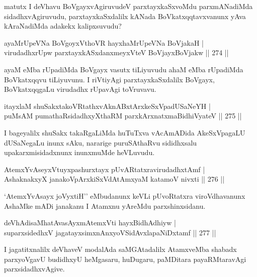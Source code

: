 \begin{artha}
matutx I deVhavu BoVgayxvAgiruvudeV parxtayxkaSxvoMdu parxmANadiMda sidadhxvAgiruvudu, parxtayxkaSxdalilx kANada BoVkatxqqtavxvanunx yAva kAraNadiMda adakekx kalipxsuvudu?
\end{artha}


\begin{shl}
ayaMrUpeVNa BoVgoyxV\s thoVR hayxhaMrUpeVNa BoVjakaH | \\
virudadhxrUpw parxtayxkASxdanxmeyxVteV BoVjayxBoVjakw \hfill ||  274 ||  
\end{shl}	

\begin{artha}
ayaM eMba rUpadiMda BoVgayx vasutx tiLiyuvudu ahaM eMba rUpadiMda BoVkatxqqvu tiLiyuvunu. I riVtiyAgi parxtayxkaSxdalilx BoVgayx, BoVkatxqqgaLu virudadhx rUpavAgi toVruvavu.
\end{artha}

\begin{shl}
itayxlaM shuSakxtakoVRtathxvAknABxtArxkeSxVpadUSaNeYH | \\
puMsAM pumathaRsidadhxyXthaRM parxkArxnatxmaBidhiVyateV \hfill ||  275 ||  
\end{shl}

\begin{artha}
I bageyalilx shuSakx takaRgaLiMda huTuTxva vAcAmADida AkeSxVpagaLU dUSaNegaLu inunx sAku, nararige puruSAthaRvu sididhxsalu upakarxmisidadxnunx inunxmuMde heVLuvudu.
\end{artha}

\begin{shl}
AtemxYvAseyxVtuyxpashurxtayx pUvARtatxravirudadhxtAmf | \\
AshaknakxyX janakoV\s pArxkiSxVdAtAmx\s yaM katamoV nivxti \hfill ||  276 ||  
\end{shl}

\begin{artha}
`AtemxYvAsayx joVyxtiH'' eMbudanunx keVLi pUvoRtatxra viroVdhavanunx AshaMke mADi janakanu I Atamxnu yAreMdu parxshinxsidanu.
\end{artha}

\begin{shl}
deVhAdisaMhatAvasAyxmAtemxVti hayxBidhAdhiyw | \\
suparxsidedhxV jagatayxsimxnAnxyoVSidAvxlapaNiDxtamf \hfill ||  277 || 
\end{shl}

\begin{artha}
I jagatitxnalilx deVhaveV modalAda saMGAtadalilx AtamxveMba shabadx parxyoVgavU budidhxyU heMgasaru, huDugaru, paMDitara payaRMtaravAgi parxsidadhxvAgive.
\end{artha}

